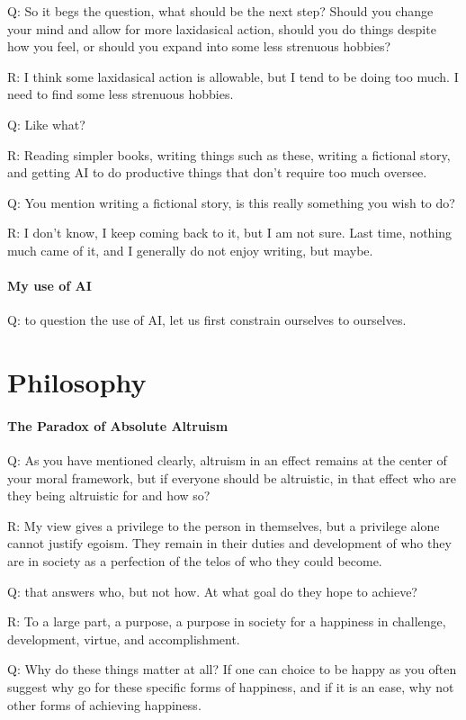 Q: So it begs the question, what should be the next step? Should you change your mind and allow for more laxidasical action, should you do things despite how you feel, or should you expand into some less strenuous hobbies?

R: I think some laxidasical action is allowable, but I tend to be doing too much. I need to find some less strenuous hobbies.

Q: Like what?

R: Reading simpler books, writing things such as these, writing a fictional story, and getting AI to do productive things that don't require too much oversee.

Q: You mention writing a fictional story, is this really something you wish to do?

R: I don't know, I keep coming back to it, but I am not sure. Last time, nothing much came of it, and I generally do not enjoy writing, but maybe.
\paragraph{My use of AI}

Q: to question the use of AI, let us first constrain ourselves to ourselves.
\section{Philosophy}
\paragraph{The Paradox of Absolute Altruism}
Q: As you have mentioned clearly, altruism in an effect remains at the center of your moral framework, but if everyone should be altruistic, in that effect who are they being altruistic for and how so?

R: My view gives a privilege to the person in themselves, but a privilege alone cannot justify egoism. They remain in their duties and development of who they are in society as a perfection of the telos of who they could become.

Q: that answers who, but not how. At what goal do they hope to achieve?

R: To a large part, a purpose, a purpose in society for a happiness in challenge, development, virtue, and accomplishment.

Q: Why do these things matter at all? If one can choice to be happy as you often suggest why go for these specific forms of happiness, and if it is an ease, why not other forms of achieving happiness.

